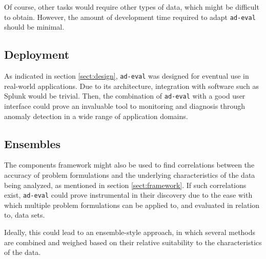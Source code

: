 Of course, other tasks would require other types of data, which might be difficult to obtain. However, the amount of development time required to adapt \texttt{ad-eval} should be minimal.

\subsection{Deployment}

As indicated in section \ref{sect:design}, \texttt{ad-eval} was designed for eventual use in real-world applications. Due to its architecture, integration with software such as Splunk would be trivial. Then, the combination of \texttt{ad-eval} with a good user interface could prove an invaluable tool to monitoring and diagnosis through anomaly detection in a wide range of application domains. 

\subsection{Ensembles}

The components framework might also be used to find correlations between the accuracy of problem formulations and the underlying characteristics of the data being analyzed, as mentioned in section \ref{sect:framework}. If such correlations exist, \texttt{ad-eval} could prove instrumental in their discovery due to the ease with which multiple problem formulations can be applied to, and evaluated in relation to, data sets.

Ideally, this could lead to an ensemble-style approach, in which several methods are combined and weighed based on their relative suitability to the characteristics of the data.
